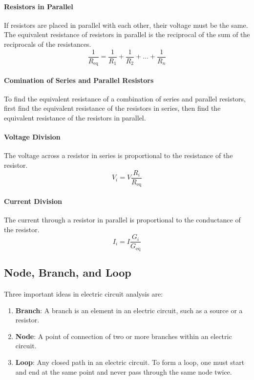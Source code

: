 \documentclass[11pt]{article}
\begin{document}
\paragraph{Resistors in Parallel} If resistors are placed in parallel with each other, their voltage must be the same. The equivalent resistance of resistors in parallel is the reciprocal of the sum of the reciprocals of the resistances.
\begin{equation}
    \frac{1}{R_{\text{eq}}} = \frac{1}{R_1} + \frac{1}{R_2} + \dots + \frac{1}{R_n}
\end{equation}
\paragraph{Comination of Series and Parallel Resistors} To find the equivalent resistance of a combination of series and parallel resistors, first find the equivalent resistance of the resistors in series, then find the equivalent resistance of the resistors in parallel.
\paragraph{Voltage Division} The voltage across a resistor in series is proportional to the resistance of the resistor.
\begin{equation}
    V_i = V \frac{R_i}{R_{\text{eq}}}
\end{equation}
\paragraph{Current Division} The current through a resistor in parallel is proportional to the conductance of the resistor.
\begin{equation}
    I_i = I \frac{G_i}{G_{\text{eq}}}
\end{equation}
\subsection{Node, Branch, and Loop}
\paragraph{} Three important ideas in electric circuit analysis are:
\begin{enumerate}
    \item \textbf{Branch}: A branch is an element in an electric circuit, such as a source or a resistor.
    \item \textbf{Node}: A point of connection of two or more branches within an electric circuit.
    \item \textbf{Loop}: Any closed path in an electric circuit. To form a loop, one must start and end at the same point and never pass through the same node twice.
\end{enumerate}
\end{document}
